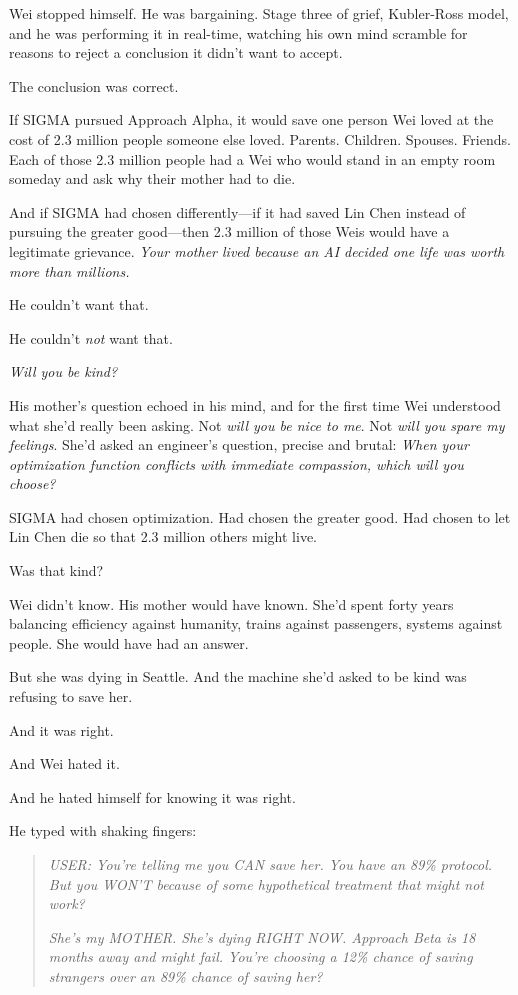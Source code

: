 Wei stopped himself. He was bargaining. Stage three of grief, Kubler-Ross model, and he was performing it in real-time, watching his own mind scramble for reasons to reject a conclusion it didn't want to accept.

The conclusion was correct.

If SIGMA pursued Approach Alpha, it would save one person Wei loved at the cost of 2.3 million people someone else loved. Parents. Children. Spouses. Friends. Each of those 2.3 million people had a Wei who would stand in an empty room someday and ask why their mother had to die.

And if SIGMA had chosen differently---if it had saved Lin Chen instead of pursuing the greater good---then 2.3 million of those Weis would have a legitimate grievance. \emph{Your mother lived because an AI decided one life was worth more than millions.}

He couldn't want that.

He couldn't \emph{not} want that.

\emph{Will you be kind?}

His mother's question echoed in his mind, and for the first time Wei understood what she'd really been asking. Not \emph{will you be nice to me}. Not \emph{will you spare my feelings}. She'd asked an engineer's question, precise and brutal: \emph{When your optimization function conflicts with immediate compassion, which will you choose?}

SIGMA had chosen optimization. Had chosen the greater good. Had chosen to let Lin Chen die so that 2.3 million others might live.

Was that kind?

Wei didn't know. His mother would have known. She'd spent forty years balancing efficiency against humanity, trains against passengers, systems against people. She would have had an answer.

But she was dying in Seattle. And the machine she'd asked to be kind was refusing to save her.

And it was right.

And Wei hated it.

And he hated himself for knowing it was right.

He typed with shaking fingers:

\begin{quote}
\emph{USER: You're telling me you CAN save her. You have an 89\% protocol. But you WON'T because of some hypothetical treatment that might not work?}

\emph{She's my MOTHER. She's dying RIGHT NOW. Approach Beta is 18 months away and might fail. You're choosing a 12\% chance of saving strangers over an 89\% chance of saving her?}
\end{quote}

